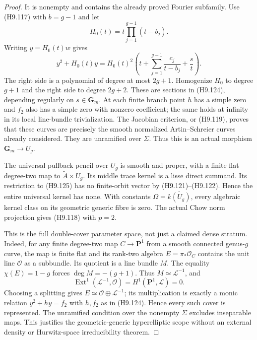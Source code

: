 \begin{proof}
It is nonempty and contains the already proved
Fourier subfamily. Use (H9.117) with $b=g-1$
and let
\[
           H_0(t)=t\prod_{j=1}^{g-1}(t-b_j).
\]
Writing $y=H_0(t)w$ gives
\[
 y^2+H_0(t)y
       =H_0(t)^2\left(t+
           \sum_{j=1}^{g-1}\frac{c_j}{t-b_j}+
                                          \frac{s}{t}\right).
                                                               \tag{H9.125}
\]
The right side is a polynomial of degree at most
$2g+1$. Homogenize $H_0$ to degree $g+1$ and
the right side to degree $2g+2$. These are
sections in (H9.124), depending regularly on
$s\in\mathbf G_m$. At each finite branch
point $h$ has a simple zero and $f_2$ also
has a simple zero with nonzero coefficient;
the same holds at infinity in its local
line-bundle trivialization. The Jacobian
criterion, or (H9.119), proves that these
curves are precisely the smooth normalized
Artin--Schreier curves already considered.
They are unramified over $\Sigma$. Thus this
is an actual morphism $\mathbf G_m\to U_g$.

The universal pullback pencil over $U_g$ is
smooth and proper, with a finite flat
degree-two map to $\widetilde A\times U_g$.
Its middle trace kernel is a lisse direct
summand. Its restriction to (H9.125) has no
finite-orbit vector by (H9.121)--(H9.122).
Hence the entire universal kernel has none.
With constants $\Omega=\overline{k(U_g)}$,
every algebraic kernel class on its geometric
generic fibre is zero. The actual Chow norm
projection gives (H9.118) with $p=2$.

This is the full double-cover parameter space,
not just a claimed dense stratum. Indeed, for
any finite degree-two map $C\to\mathbf P^1$
from a smooth connected genus-$g$ curve,
the map is finite flat and its rank-two
algebra $E=\pi_*\mathcal O_C$ contains the
unit line $\mathcal O$ as a subbundle. Its
quotient is a line bundle $M$. The equality
$\chi(E)=1-g$ forces $\deg M=-(g+1)$.
Thus $M\simeq\mathcal L^{-1}$, and
\[
 \operatorname{Ext}^1(\mathcal L^{-1},\mathcal O)
          =H^1(\mathbf P^1,\mathcal L)=0.
\]
Choosing a splitting gives
$E\simeq\mathcal O\oplus\mathcal L^{-1}$;
its multiplication is exactly a monic
relation $y^2+h y=f_2$ with $h,f_2$ as in
(H9.124). Hence every such cover is represented.
The unramified condition over the nonempty
$\Sigma$ excludes inseparable maps. This
justifies the geometric-generic hyperelliptic
scope without an external density or
Hurwitz-space irreducibility theorem.


\end{proof}
